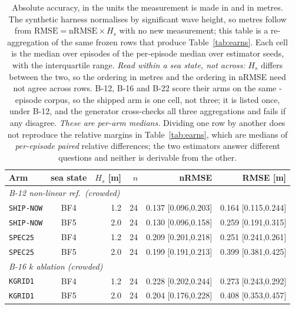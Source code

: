 
\begin{table}[!htbp]
\centering
\footnotesize
\caption{Absolute accuracy, in the units the measurement is made in and in metres. The synthetic harness normalises by significant wave height, so metres follow from $\text{RMSE} = \text{nRMSE}\times H_s$ with no new measurement; this table is a re-aggregation of the same frozen rows that produce Table~\ref{tab:earns}. Each cell is the median over episodes of the per-episode median over estimator seeds, with the interquartile range. \emph{Read within a sea state, not across:} $H_s$ differs between the two, so the ordering in metres and the ordering in nRMSE need not agree across rows. B-12, B-16 and B-22 score their arms on the same \AblationEps{}-episode corpus, so the shipped arm is one cell, not three; it is listed once, under B-12, and the generator cross-checks all three aggregations and fails if any disagree. \emph{These are per-arm medians.} Dividing one row by another does not reproduce the relative margins in Table~\ref{tab:earns}, which are medians of \emph{per-episode paired} relative differences; the two estimators answer different questions and neither is derivable from the other.}
\label{tab:absolute}
\setlength{\tabcolsep}{4pt}
\begin{tabular}{lcrrrr}
\toprule
Arm & sea state & $H_s$ [m] & $n$ & nRMSE & RMSE [m] \\
\midrule
\multicolumn{6}{l}{\emph{B-12  non-linear ref.\ (crowded)}} \\
\quad \texttt{SHIP-NOW} & BF4 & 1.2 & 24 & 0.137 {\scriptsize[0.096,0.203]} & 0.164 {\scriptsize[0.115,0.244]} \\
\quad \texttt{SHIP-NOW} & BF5 & 2.0 & 24 & 0.130 {\scriptsize[0.096,0.158]} & 0.259 {\scriptsize[0.191,0.315]} \\
\quad \texttt{SPEC25} & BF4 & 1.2 & 24 & 0.209 {\scriptsize[0.201,0.218]} & 0.251 {\scriptsize[0.241,0.261]} \\
\quad \texttt{SPEC25} & BF5 & 2.0 & 24 & 0.199 {\scriptsize[0.191,0.213]} & 0.399 {\scriptsize[0.381,0.425]} \\
\midrule
\multicolumn{6}{l}{\emph{B-16  $k$ ablation (crowded)}} \\
\quad \texttt{KGRID1} & BF4 & 1.2 & 24 & 0.228 {\scriptsize[0.202,0.244]} & 0.273 {\scriptsize[0.243,0.292]} \\
\quad \texttt{KGRID1} & BF5 & 2.0 & 24 & 0.204 {\scriptsize[0.176,0.228]} & 0.408 {\scriptsize[0.353,0.457]} \\

\end{tabular}
\end{table}

